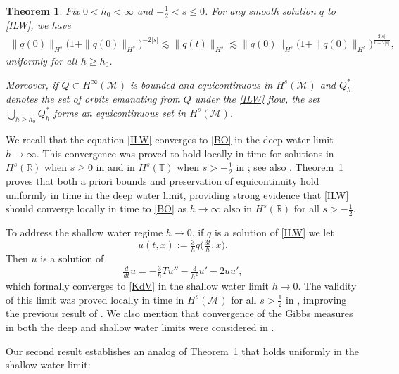 \documentclass{amsart}
\newcommand{\R}{{\mathbb{R}}}
\newcommand{\T}{{\mathbb{T}}}
\newtheorem{theorem}{Theorem}[section]
\theoremstyle{definition}
\theoremstyle{remark}
\begin{document}
\begin{theorem}\label{T1} Fix $0<h_0<\infty$ and $-\frac12< s\leq 0$.  For any smooth solution $q$ to \eqref{ILW}, we have
\begin{align}\label{a priori bdds}
\| q(0) \|_{H^s} \bigl( 1 +  \| q(0) \|_{H^s}\bigr)^{-2|s|} \lesssim \| q(t) \|_{H^s} \lesssim \| q(0) \|_{H^s} \bigl( 1 +  \| q(0) \|_{H^s}\bigr)^{\frac{2|s|}{1-2|s|}},
\end{align}
uniformly for all \(h\geq h_0\).

Moreover, if $Q\subset H^\infty(\mathcal M)$ is bounded and equicontinuous in $H^{s}(\mathcal M)$ and \(Q_h^*\) denotes the set of orbits emanating from $Q$ under the \eqref{ILW} flow, the set \(\bigcup_{h\geq h_0}Q_h^*\) forms an equicontinuous set in $H^{s}(\mathcal M)$.
\end{theorem}


We recall that the equation \eqref{ILW} converges to \eqref{BO} in the deep water limit \(h\to \infty\).  This convergence was proved to hold locally in time for solutions in \(H^s(\R)\) when \(s\geq 0\) in \cite{CLOP} and in \(H^s(\T)\) when \(s>-\frac12\) in \cite{GL}; see also \cite{ABFS,MR4866612,MR4752554}.  Theorem~\ref{T1} proves that both a priori bounds and preservation of equicontinuity hold uniformly in time in the deep water limit, providing strong evidence that \eqref{ILW} should converge locally in time to \eqref{BO} as \(h\to\infty\) also in \(H^s(\R)\) for all \(s>-\frac12\).

To address the shallow water regime $h\to 0$, if \(q\) is a solution of \eqref{ILW} we let
\[
u(t,x) := \tfrac3hq\bigl(\tfrac{3t}h,x\bigr).
\]
Then \(u\) is a solution of
\begin{equation}\label{ILW'}\tag{ILW$'$}
\tfrac{d}{dt}u = - \tfrac3hTu'' - \tfrac3{h^2} u' -2uu',
\end{equation}
which formally converges to \eqref{KdV} in the shallow water limit \(h\to0\).  The validity of this limit was proved locally in time in \(H^s(\mathcal M)\) for all \(s>\frac12\) in \cite{MR4752554}, improving the previous result of \cite{ABFS}.  We also mention that convergence of the Gibbs measures in both the deep and shallow water limits were considered in \cite{MR4878416}.

Our second result establishes an analog of Theorem~\ref{T1} that holds uniformly in the shallow water limit:
\end{document}
